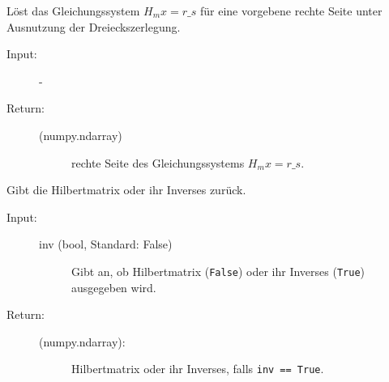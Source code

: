 \documentclass[letterpaper,10pt,ngerman, oneside, openright]{sphinxmanual}
\begin{document}
\begin{fulllineitems}
\begin{fulllineitems}
\begin{description}
\begin{description}
\end{description}

\end{description}

\end{fulllineitems}


\begin{fulllineitems}
\label{\detokenize{index:hilbertmatr.Hilbert.lgs_lsg}}
Löst das Gleichungssystem $H_mx=r\_s$ für eine vorgebene rechte Seite unter Ausnutzung der
Dreieckszerlegung.

\begin{description}
\item [{Input:}] -
\end{description}
\begin{description}
\item[{Return:}] \leavevmode\begin{description}
\item[{(numpy.ndarray)}] \leavevmode
rechte Seite des Gleichungssystems $H_mx=r\_s$.

\end{description}\end{description}

\end{fulllineitems}


\begin{fulllineitems}
\label{\detokenize{index:hilbertmatr.Hilbert.return_hil_matr}}
Gibt die Hilbertmatrix oder ihr Inverses zurück.
\begin{description}
\item [{Input:}] \leavevmode



\begin{description}
\item[{inv (bool, Standard: False)}] \leavevmode
Gibt an, ob Hilbertmatrix (\texttt{False}) oder ihr Inverses (\texttt{True}) ausgegeben wird.
\end{description}

\end{description}
\begin{description}
\item[{Return:}] \leavevmode\begin{description}
\item[{(numpy.ndarray):}] \leavevmode
Hilbertmatrix oder ihr Inverses, falls \texttt{inv == True}.

\end{description}

\end{description}

\end{fulllineitems}


\end{fulllineitems}
\end{document}

